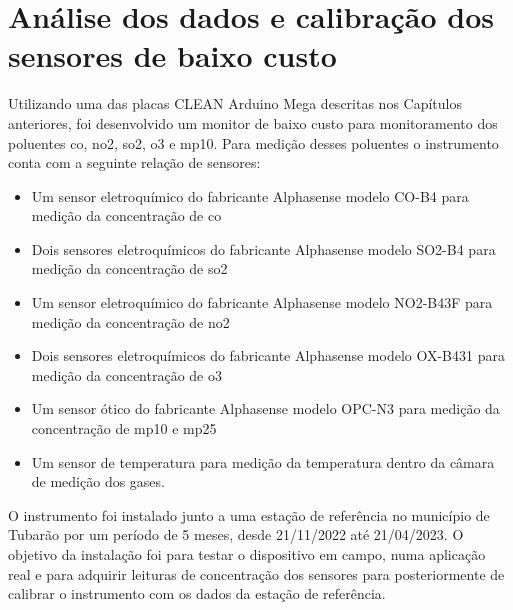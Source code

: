 \chapter{Análise dos dados e calibração dos sensores de baixo custo}\label{cap:field-monit-results}

Utilizando uma das placas CLEAN Arduino Mega descritas nos Capítulos anteriores, foi desenvolvido um monitor de baixo custo para monitoramento dos poluentes \acrshort{co}, \acrshort{no2}, \acrshort{so2}, \acrshort{o3} e \acrshort{mp10}. Para medição desses poluentes o instrumento conta com a seguinte relação de sensores:

\begin{itemize}
    \item Um sensor eletroquímico do fabricante Alphasense modelo CO-B4 para medição da concentração de \acrshort{co}
    \item Dois sensores eletroquímicos do fabricante Alphasense modelo SO2-B4 para medição da concentração de \acrshort{so2}
    \item Um sensor eletroquímico do fabricante Alphasense modelo NO2-B43F para medição da concentração de \acrshort{no2}
    \item Dois sensores eletroquímicos do fabricante Alphasense modelo OX-B431 para medição da concentração de \acrshort{o3}
    \item Um sensor ótico do fabricante Alphasense modelo OPC-N3 para medição da concentração de \acrshort{mp10} e \acrshort{mp25}
    \item Um sensor de temperatura para medição da temperatura dentro da câmara de medição dos gases.
\end{itemize}

O instrumento foi instalado junto a uma estação de referência no município de Tubarão por um período de 5 meses, desde 21/11/2022 até 21/04/2023. O objetivo da instalação foi para testar o dispositivo em campo, numa aplicação real e para adquirir leituras de concentração dos sensores para posteriormente de calibrar o instrumento com os dados da estação de referência.







